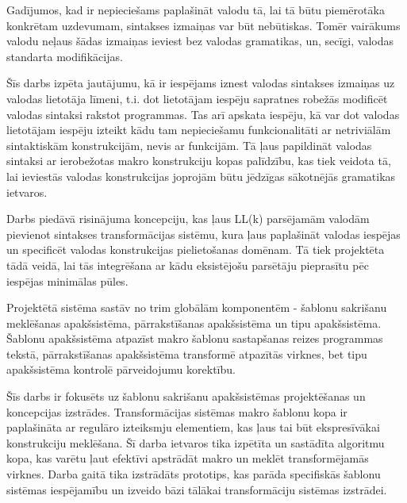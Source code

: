 Gadījumos, kad ir nepieciešams paplašināt valodu tā, lai tā būtu piemērotāka konkrētam uzdevumam, sintakses izmaiņas var būt nebūtiskas. Tomēr vairākums valodu neļaus šādas izmaiņas ieviest bez valodas gramatikas, un, secīgi, valodas standarta modifikācijas.

Šīs darbs izpēta jautājumu, kā ir iespējams iznest valodas sintakses izmaiņas uz valodas lietotāja līmeni, t.i. dot lietotājam iespēju sapratnes robežās modificēt valodas sintaksi rakstot programmas. Tas arī apskata iespēju, kā var dot valodas lietotājam iespēju izteikt kādu tam nepieciešamu funkcionalitāti ar netriviālām sintaktiskām konstrukcijām, nevis ar funkcijām. Tā ļaus papildināt valodas sintaksi ar ierobežotas makro konstrukciju kopas palīdzību, kas tiek veidota tā, lai ieviestās valodas konstrukcijas joprojām būtu jēdzīgas sākotnējās gramatikas ietvaros.

Darbs piedāvā risinājuma koncepciju, kas ļaus LL(k) parsējamām valodām pievienot sintakses transformācijas sistēmu, kura ļaus paplašināt valodas iespējas un specificēt valodas konstrukcijas pielietošanas domēnam. Tā tiek projektēta tādā veidā, lai tās integrēšana ar kādu eksistējošu parsētāju pieprasītu pēc iespējas minimālas pūles. 

Projektētā sistēma sastāv no trim globālām komponentēm - šablonu sakrišanu meklēšanas apakšsistēma, pārrakstīšanas apakšsistēma un tipu apakšsistēma. Šablonu apakšsistēma atpazīst makro šablonu sastapšanas reizes programmas tekstā, pārrakstīšanas apakšsistēma transformē atpazītās virknes, bet tipu apakšsistēma kontrolē pārveidojumu korektību.

Šīs darbs ir fokusēts uz šablonu sakrišanu apakšsistēmas projektēšanas un koncepcijas izstrādes. Transformācijas sistēmas makro šablonu kopa ir paplašināta ar regulāro izteiksmju elementiem, kas ļaus tai būt ekspresīvākai konstrukciju meklēšana. Šī darba ietvaros tika izpētīta un sastādīta algoritmu kopa, kas varētu ļaut efektīvi apstrādāt makro un meklēt transformējamās virknes. Darba gaitā tika izstrādāts prototips, kas parāda specifiskās šablonu sistēmas iespējamību un izveido bāzi tālākai transformāciju sistēmas izstrādei.


